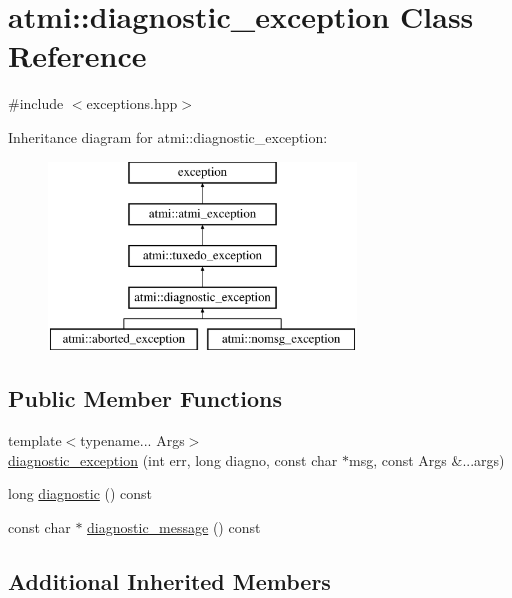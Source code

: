 \hypertarget{classatmi_1_1diagnostic__exception}{\section{atmi\+:\+:diagnostic\+\_\+exception Class Reference}
\label{classatmi_1_1diagnostic__exception}
}


{\ttfamily \#include $<$exceptions.\+hpp$>$}

Inheritance diagram for atmi\+:\+:diagnostic\+\_\+exception\+:\begin{figure}[H]
\begin{center}
\leavevmode
\includegraphics[height=5.000000cm]{classatmi_1_1diagnostic__exception}
\end{center}
\end{figure}
\subsection*{Public Member Functions}
\begin{DoxyCompactItemize}
\item 
{\footnotesize template$<$typename... Args$>$ }\\\hyperlink{classatmi_1_1diagnostic__exception_acf086c2efbe447d733a02988e56be370}{diagnostic\+\_\+exception} (int err, long diagno, const char $\ast$msg, const Args \&...args)
\item 
long \hyperlink{classatmi_1_1diagnostic__exception_a5602718873c6e8122af75d5adf9d375b}{diagnostic} () const 
\item 
const char $\ast$ \hyperlink{classatmi_1_1diagnostic__exception_a60931362229b54fc6847a3efa5e83ffd}{diagnostic\+\_\+message} () const 
\end{DoxyCompactItemize}
\subsection*{Additional Inherited Members}


